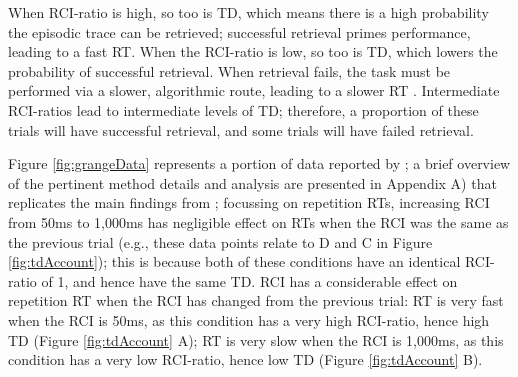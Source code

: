 \documentclass[a4paper, jou, natbib]{apa6}
\begin{document}
When RCI-ratio is high, so too is TD, which means there is a high probability the episodic trace can be retrieved; successful retrieval primes performance, leading to a fast RT. When the RCI-ratio is low, so too is TD, which lowers the probability of successful retrieval. When retrieval fails, the task must be performed via a slower, algorithmic route, leading to a slower RT \citep[see][for a similar proposal]{Logan2001}. Intermediate RCI-ratios lead to intermediate levels of TD; therefore, a proportion of these trials will have successful retrieval, and some trials will have failed retrieval. 

Figure \ref{fig:grangeData} represents a portion of data reported by \cite{Grangeinrevision}; a brief overview of the pertinent method details and analysis are presented in Appendix A) that replicates the main findings from \cite{Horoufchin2011a}; focussing on repetition RTs, increasing RCI from 50ms to 1,000ms has negligible effect on RTs when the RCI was the same as the previous trial (e.g., these data points relate to D and C in Figure \ref{fig:tdAccount}); this is because both of these conditions have an identical RCI-ratio of 1, and hence have the same TD. RCI has a considerable effect on repetition RT when the RCI has changed from the previous trial: RT is very fast when the RCI is 50ms, as this condition has a very high RCI-ratio, hence high TD (Figure \ref{fig:tdAccount} A); RT is very slow when the RCI is 1,000ms, as this condition has a very low RCI-ratio, hence low TD (Figure \ref{fig:tdAccount} B). 
\end{document}
